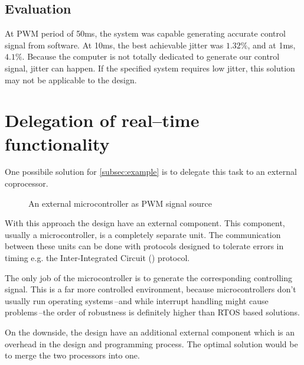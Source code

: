\subsection{Evaluation}

At PWM period of 50ms, the system was capable generating accurate control signal from software. At 10ms, the best achievable jitter was $1.32\%$, and at 1ms, $4.1\%$.
Because the computer is not totally dedicated to generate our control signal, jitter can happen. If the specified system requires low jitter, this solution may not be applicable to the design.

\section{Delegation of real--time functionality}

One possibile solution for \cref{subsec:example} is to delegate this task to an external coprocessor.

\begin{figure}[h]
	\centering
	\caption{An external microcontroller as PWM signal source}
	\label{fig:example_external_pwm}
\end{figure}

With this approach the design have an external component. This component, usually a microcontroller, is a completely separate unit. The communication between these units can be done with protocols designed to tolerate errors in timing e.g. the Inter-Integrated Circuit (\isc) protocol.

The only job of the microcontroller is to generate the corresponding controlling signal. This is a far more controlled environment, because microcontrollers don't usually run operating systems\,--and while interrupt handling might cause problems\,--the order of robustness is definitely higher than RTOS based solutions.

On the downside, the design have an additional external component which is an overhead in the design and programming process. The optimal solution would be to merge the two processors into one.

